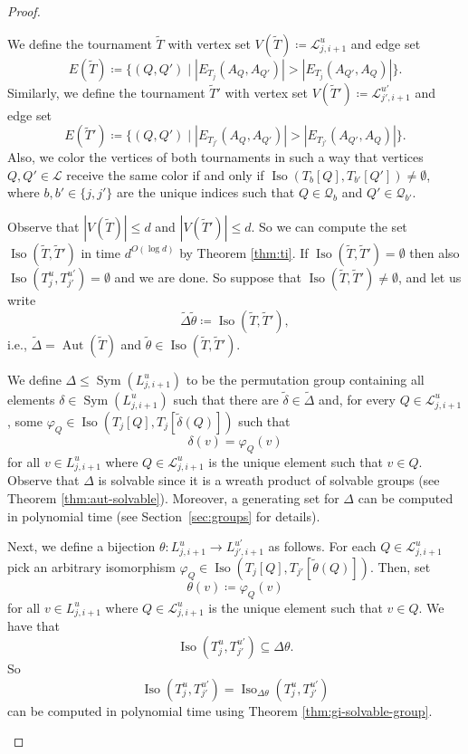 \PassOptionsToPackage{dvipsnames,svgnames}{xcolor}\documentclass[10pt,a4paper]{article}
\newcommand{\CL}{{\mathcal L}}
\newcommand{\CQ}{{\mathcal Q}}
\newcommand{\Bigmid}{\;\Big|\;}
\DeclareMathOperator{\Aut}{Aut}
\DeclareMathOperator{\Iso}{Iso}
\DeclareMathOperator{\Sym}{Sym}
\begin{document}
\begin{proof}
\begin{subproof}
  We define the tournament $\widetilde{T}$ with vertex set $V(\widetilde{T}) \coloneqq \CL_{j,i+1}^{u}$ and edge set
  \[E(\widetilde{T}) \coloneqq \Big\{(Q,Q') \Bigmid |E_{T_j}(A_Q,A_{Q'})| > |E_{T_j}(A_{Q'},A_Q)|\Big\}.\]
  Similarly, we define the tournament $\widetilde{T}'$ with vertex set
  $V(\widetilde{T}') \coloneqq \CL_{j',i+1}^{u'}$ and edge set
  \[E(\widetilde{T}') \coloneqq \Big\{(Q,Q') \Bigmid |E_{T_{j'}}(A_Q,A_{Q'})| > |E_{T_{j'}}(A_{Q'},A_Q)|\Big\}.\]
  Also, we color the vertices of both tournaments in such a way that vertices $Q,Q' \in \CL$ receive the same color if and only if $\Iso(T_b[Q],T_{b'}[Q']) \neq \emptyset$, where $b,b' \in \{j,j'\}$ are the unique indices such that $Q \in \CQ_b$ and $Q' \in \CQ_{b'}$.

  Observe that $|V(\widetilde{T})| \leq d$ and $|V(\widetilde{T}')| \leq d$.
  So we can compute the set $\Iso(\widetilde{T},\widetilde{T}')$ in time $d^{O(\log d)}$ by Theorem \ref{thm:ti}.
  If $\Iso(\widetilde{T},\widetilde{T}') = \emptyset$ then also $\Iso(T_j^u,T_{j'}^{u'}) = \emptyset$ and we are done.
  So suppose that $\Iso(\widetilde{T},\widetilde{T}') \neq \emptyset$, and let us write
  \[\widetilde{\Delta}\widetilde{\theta} \coloneqq \Iso(\widetilde{T},\widetilde{T}'),\]
  i.e., $\widetilde{\Delta} = \Aut(\widetilde{T})$ and $\widetilde{\theta} \in \Iso(\widetilde{T},\widetilde{T}')$.

  We define $\Delta \leq \Sym(L_{j,i+1}^{u})$ to be the permutation group containing all elements $\delta \in \Sym(L_{j,i+1}^{u})$ such that there are $\widetilde{\delta} \in \widetilde{\Delta}$ and, for every $Q \in \CL_{j,i+1}^{u}$, some $\varphi_Q \in \Iso(T_j[Q],T_j[\widetilde{\delta}(Q)])$ such that
  \[\delta(v) = \varphi_Q(v)\]
  for all $v \in L_{j,i+1}^{u}$ where $Q \in \CL_{j,i+1}^{u}$ is the unique element such that $v \in Q$.
  Observe that $\Delta$ is solvable since it is a wreath product of solvable groups (see Theorem \ref{thm:aut-solvable}).
  Moreover, a generating set for $\Delta$ can be computed in polynomial time (see Section~\ref{sec:groups} for details).

  Next, we define a bijection $\theta\colon L_{j,i+1}^{u} \to L_{j',i+1}^{u'}$ as follows.
  For each $Q \in \CL_{j,i+1}^{u}$ pick an arbitrary isomorphism $\varphi_Q \in \Iso(T_j[Q],T_{j'}[\widetilde{\theta}(Q)])$.
  Then, set
  \[\theta(v) \coloneqq \varphi_Q(v)\]
  for all $v \in L_{j,i+1}^{u}$ where $Q \in \CL_{j,i+1}^{u}$ is the unique element such that $v \in Q$.
  We have that
  \[\Iso(T_j^u,T_{j'}^{u'}) \subseteq \Delta\theta.\]
  So
  \[\Iso(T_j^u,T_{j'}^{u'}) = \Iso_{\Delta\theta}(T_j^u,T_{j'}^{u'})\]
  can be computed in polynomial time using Theorem \ref{thm:gi-solvable-group}.
 \end{subproof}


\end{proof}
\end{document}
